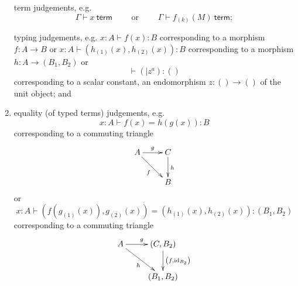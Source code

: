 \documentclass[pra,floatfix,
amsmath,superscriptaddress, 12pt]{article}
\theoremstyle{definition}
\newcommand{\fF}{\mathfrak{F}}
\newcommand{\cG}{\mathcal{G}}
\newcommand{\cR}{\mathcal{R}}
\newcommand{\mc}[1]{\mathcal{#1}}
\DeclareMathOperator{\id}{{\normalfont\text{id}}}
\begin{document}
\begin{enumerate}


term judgements, e.g. 
\[
\Gamma\vdash x\ \mathsf{term} \qquad \textrm{ or } \qquad \Gamma\vdash f_{\left(k\right)}\left(M\right)\ \mathsf{term};
\]

 
typing judgements, e.g. 
$x:A\vdash f\left(x\right):B$
corresponding to a morphism $f:A\longrightarrow B$ or
$ x:A\vdash\left(h_{\left(1\right)}\left(x\right),h_{\left(2\right)}\left(x\right)\right):B$
 corresponding to a morphism $h:A\longrightarrow\left(B_{1},B_{2}\right)$
or 
\[
\vdash\left(|z^{a}\right):\left(\right)
\]
 corresponding to a scalar constant, an endomorphism $z:\left(\right)\longrightarrow\left(\right)$
of the unit object; and
\item equality (of typed terms) judgements, e.g. 
\[
x:A\vdash f\left(x\right)=h\left(g\left(x\right)\right):B
\]
corresponding to a commuting triangle 
\[
\xymatrix{A\ar[r]^{g}\ar[dr]_{f} & C\ar[d]^{h}\\
 & B
}
\]
or 
\[
x:A\vdash\left(f\left(g_{\left(1\right)}\left(x\right)\right),g_{\left(2\right)}\left(x\right)\right)=\left(h_{\left(1\right)}\left(x\right),h_{\left(2\right)}\left(x\right)\right):\left(B_{1},B_{2}\right)
\]
corresponding to a commuting triangle
\[
\xymatrix{A\ar[r]^{g}\ar[dr]_{h} & \left(C,B_{2}\right)\ar[d]^{\left(f,\id_{B_{2}}\right)}\\
 & \left(B_{1},B_{2}\right)
}
\]
 

\end{enumerate}
\end{document}
